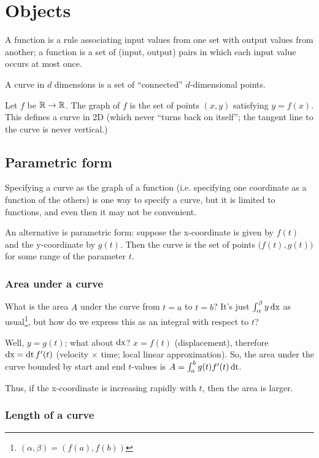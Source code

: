 \documentclass[12pt]{article}
\begin{document}
\section*{Objects}

A function is a rule associating input values from one set with output values
from another; a function is a set of (input, output) pairs in which each input
value occurs at most once.

A curve in $d$ dimensions is a set of ``connected'' $d$-dimensional points.

Let $f$ be $\mathbb{R} \to \mathbb{R}$. The graph of $f$ is the set of points $(x,y)$
satisfying $y = f(x)$. This defines a curve in 2D (which never ``turns back on
itself''; the tangent line to the curve is never vertical.)

\subsection*{Parametric form}

Specifying a curve as the graph of a function (i.e. specifying one coordinate
as a function of the others) is one way to specify a curve, but it is limited
to functions, and even then it may not be convenient.

An alternative is parametric form: suppose the x-coordinate is given by $f(t)$
and the y-coordinate by $g(t)$. Then the curve is the set of points
$\big(f(t), g(t)\big)$ for some range of the parameter $t$.

\subsubsection*{Area under a curve}

What is the area $A$ under the curve from $t=a$ to $t=b$? It's just
$\int_\alpha^\beta y \operatorname{\text{dx}}$ as usual\footnote{$(\alpha, \beta) = (f(a), f(b))$},
but how do we express this as an integral with respect to $t$?

Well, $y = g(t)$; what about $\operatorname{\text{dx}}$? $x = f(t)$ (displacement), therefore
$\operatorname{\text{dx}} = \operatorname{\text{dt}} f'(t)$ (velocity $\times$ time; local linear approximation). So, the
area under the curve bounded by start and end $t$-values is
$A = \int_a^b g(t) f'(t) \operatorname{\text{dt}}$.

Thus, if the x-coordinate is increasing rapidly with $t$, then the area is
larger.

\subsubsection*{Length of a curve}
\end{document}
